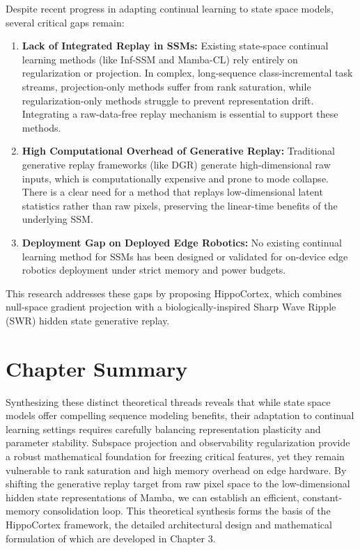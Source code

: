 Despite recent progress in adapting continual learning to state space models, several critical gaps remain:
\begin{enumerate}
    \item \textbf{Lack of Integrated Replay in SSMs:} Existing state-space continual learning methods (like Inf-SSM and Mamba-CL) rely entirely on regularization or projection. In complex, long-sequence class-incremental task streams, projection-only methods suffer from rank saturation, while regularization-only methods struggle to prevent representation drift. Integrating a raw-data-free replay mechanism is essential to support these methods.
    \item \textbf{High Computational Overhead of Generative Replay:} Traditional generative replay frameworks (like DGR) generate high-dimensional raw inputs, which is computationally expensive and prone to mode collapse. There is a clear need for a method that replays low-dimensional latent statistics rather than raw pixels, preserving the linear-time benefits of the underlying SSM.
    \item \textbf{Deployment Gap on Deployed Edge Robotics:} No existing continual learning method for SSMs has been designed or validated for on-device edge robotics deployment under strict memory and power budgets.
\end{enumerate}

This research addresses these gaps by proposing HippoCortex, which combines null-space gradient projection with a biologically-inspired Sharp Wave Ripple (SWR) hidden state generative replay.

\section{Chapter Summary}
\label{sec:lit_review_summary}

Synthesizing these distinct theoretical threads reveals that while state space models offer compelling sequence modeling benefits, their adaptation to continual learning settings requires carefully balancing representation plasticity and parameter stability. Subspace projection and observability regularization provide a robust mathematical foundation for freezing critical features, yet they remain vulnerable to rank saturation and high memory overhead on edge hardware. By shifting the generative replay target from raw pixel space to the low-dimensional hidden state representations of Mamba, we can establish an efficient, constant-memory consolidation loop. This theoretical synthesis forms the basis of the HippoCortex framework, the detailed architectural design and mathematical formulation of which are developed in Chapter 3.
